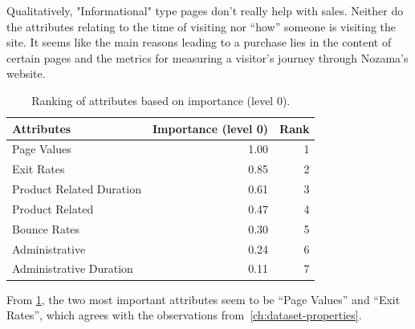 \documentclass[../cmpe-251-project-report.tex]{subfiles}
\begin{document}
  Qualitatively, "Informational" type pages don't really help with sales. Neither do the attributes relating to the time of visiting nor ``how'' someone is visiting the site. It seems like the main reasons leading to a purchase lies in the content of certain pages and the metrics for measuring a visitor's journey through Nozama's website.
  \begin{table}
    \caption{Ranking of attributes based on importance (level 0).}
    \label{tab:attribute-ranking}
    \begin{tabular}{lrr}
      \toprule
      Attributes               & Importance (level 0) & Rank \\
      \midrule
      Page Values              & 1.00                 & 1    \\
      Exit Rates               & 0.85                 & 2    \\
      Product Related Duration & 0.61                 & 3    \\
      Product Related          & 0.47                 & 4    \\
      Bounce Rates             & 0.30                 & 5    \\
      Administrative           & 0.24                 & 6    \\
      Administrative Duration  & 0.11                 & 7    \\
      \bottomrule
    \end{tabular}
  \end{table}
  From \cref{tab:attribute-ranking}, the two most important attributes seem to be ``Page Values'' and ``Exit Rates'', which agrees with the observations from~\cref{ch:dataset-properties}.
\end{document}

